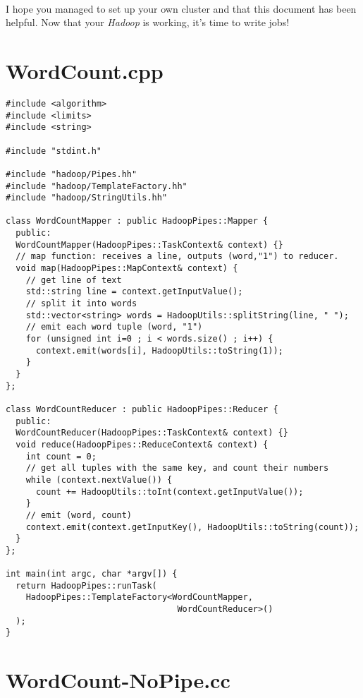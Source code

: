 \documentclass[a4paper, 12pt]{article}
\begin{document}
~\\
I hope you managed to set up your own cluster and that this document has been helpful. Now that your \textit{Hadoop} is working, it's time to write jobs!

\newpage
\begin{appendices}

  \section{WordCount.cpp}
  \label{wordcount} 

\begin{lstlisting}[style=cpp]
#include <algorithm>
#include <limits>
#include <string>

#include "stdint.h"

#include "hadoop/Pipes.hh"
#include "hadoop/TemplateFactory.hh"
#include "hadoop/StringUtils.hh"

class WordCountMapper : public HadoopPipes::Mapper {
  public:
  WordCountMapper(HadoopPipes::TaskContext& context) {}
  // map function: receives a line, outputs (word,"1") to reducer.
  void map(HadoopPipes::MapContext& context) {
    // get line of text
    std::string line = context.getInputValue();
    // split it into words
    std::vector<string> words = HadoopUtils::splitString(line, " ");
    // emit each word tuple (word, "1")
    for (unsigned int i=0 ; i < words.size() ; i++) {
      context.emit(words[i], HadoopUtils::toString(1));
    }
  }
};

class WordCountReducer : public HadoopPipes::Reducer {
  public:
  WordCountReducer(HadoopPipes::TaskContext& context) {}
  void reduce(HadoopPipes::ReduceContext& context) {
    int count = 0;
    // get all tuples with the same key, and count their numbers
    while (context.nextValue()) {
      count += HadoopUtils::toInt(context.getInputValue());
    }
    // emit (word, count)
    context.emit(context.getInputKey(), HadoopUtils::toString(count));
  }
};

int main(int argc, char *argv[]) {
  return HadoopPipes::runTask(
    HadoopPipes::TemplateFactory<WordCountMapper,
                                  WordCountReducer>()
  );
} 
\end{lstlisting}

  \newpage
  \section{WordCount-NoPipe.cc}
  \label{wordcountnopipe}


\end{appendices}
\end{document}
